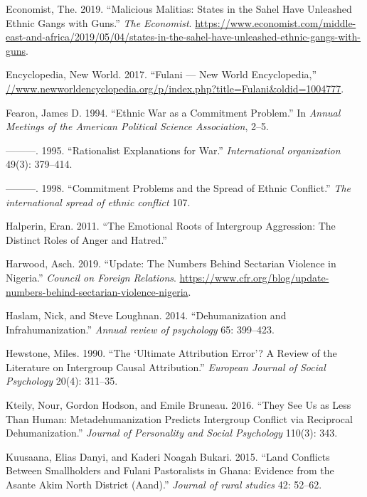 \documentclass[11pt]{article}
\begin{document}
\leavevmode\hypertarget{ref-economist2019militias}{}%
Economist, The. 2019. ``Malicious Malitias: States in the Sahel Have
Unleashed Ethnic Gangs with Guns.'' \emph{The Economist}.
\url{https://www.economist.com/middle-east-and-africa/2019/05/04/states-in-the-sahel-have-unleashed-ethnic-gangs-with-guns}.

\leavevmode\hypertarget{ref-fulanisize2017}{}%
Encyclopedia, New World. 2017. ``Fulani --- New World Encyclopedia,''
\url{//www.newworldencyclopedia.org/p/index.php?title=Fulani\&oldid=1004777}.

\leavevmode\hypertarget{ref-fearon1994ethnic}{}%
Fearon, James D. 1994. ``Ethnic War as a Commitment Problem.'' In
\emph{Annual Meetings of the American Political Science Association},
2--5.

\leavevmode\hypertarget{ref-fearon1995rationalist}{}%
---------. 1995. ``Rationalist Explanations for War.''
\emph{International organization} 49(3): 379--414.

\leavevmode\hypertarget{ref-fearon1998commitment}{}%
---------. 1998. ``Commitment Problems and the Spread of Ethnic
Conflict.'' \emph{The international spread of ethnic conflict} 107.

\leavevmode\hypertarget{ref-halperin2011emotional}{}%
Halperin, Eran. 2011. ``The Emotional Roots of Intergroup Aggression:
The Distinct Roles of Anger and Hatred.''

\leavevmode\hypertarget{ref-council2019nigeria}{}%
Harwood, Asch. 2019. ``Update: The Numbers Behind Sectarian Violence in
Nigeria.'' \emph{Council on Foreign Relations}.
\url{https://www.cfr.org/blog/update-numbers-behind-sectarian-violence-nigeria}.

\leavevmode\hypertarget{ref-haslam2014dehumanization}{}%
Haslam, Nick, and Steve Loughnan. 2014. ``Dehumanization and
Infrahumanization.'' \emph{Annual review of psychology} 65: 399--423.

\leavevmode\hypertarget{ref-hewstone1990ultimate}{}%
Hewstone, Miles. 1990. ``The `Ultimate Attribution Error'? A Review of
the Literature on Intergroup Causal Attribution.'' \emph{European
Journal of Social Psychology} 20(4): 311--35.

\leavevmode\hypertarget{ref-kteily2016they}{}%
Kteily, Nour, Gordon Hodson, and Emile Bruneau. 2016. ``They See Us as
Less Than Human: Metadehumanization Predicts Intergroup Conflict via
Reciprocal Dehumanization.'' \emph{Journal of Personality and Social
Psychology} 110(3): 343.

\leavevmode\hypertarget{ref-kuusaana2015land}{}%
Kuusaana, Elias Danyi, and Kaderi Noagah Bukari. 2015. ``Land Conflicts
Between Smallholders and Fulani Pastoralists in Ghana: Evidence from the
Asante Akim North District (Aand).'' \emph{Journal of rural studies} 42:
52--62.
\end{document}

